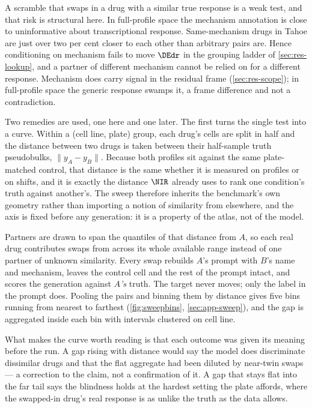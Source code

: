 A scramble that swaps in a drug with a similar true response is a weak test, and
that risk is structural here. In full-profile space the mechanism annotation is
close to uninformative about transcriptional response. Same-mechanism drugs in
Tahoe are just over two per cent closer to each other than arbitrary pairs
are.
Hence conditioning on mechanism fails to move $\DEdr$ in the grouping ladder of
\cref{sec:res-lookup}, and a partner of different mechanism cannot be relied on
for a different response. Mechanism does carry signal in the residual frame
(\cref{sec:res-scope}); in full-profile space the generic response swamps it, a
frame difference and not a contradiction.

Two remedies are used, one here and one later. The first turns the single test
into a curve. Within a (cell line, plate) group, each drug's cells are split in
half and the distance between two drugs is taken between their half-sample truth
pseudobulks, $\lVert y_A - y_B \rVert$. Because both profiles sit against the
same plate-matched control, that distance is the same whether it is measured on
profiles or on shifts, and it is exactly the distance $\NIR$ already uses to rank
one condition's truth against another's. The sweep therefore inherits the
benchmark's own geometry rather than importing a notion of similarity from
elsewhere, and the axis is fixed before any generation: it is a property of the
atlas, not of the model.

Partners are drawn to span the quantiles of that distance from $A$, so each real
drug contributes swaps from across its whole available range instead of one
partner of unknown similarity. Every swap rebuilds $A$'s prompt with $B$'s name
and mechanism, leaves the control cell and the rest of the prompt intact, and
scores the generation against \emph{$A$'s} truth. The target never moves; only
the label in the prompt does. Pooling the pairs and binning them by distance
gives five bins running from nearest to farthest
(\cref{fig:sweepbins}, \cref{sec:app-sweep}), and the gap is aggregated inside
each bin with intervals clustered on cell line.

What makes the curve worth reading is that each outcome was given its meaning
before the run. A gap rising with distance would say the model does discriminate
dissimilar drugs and that the flat aggregate had been diluted by near-twin swaps
--- a correction to the claim, not a confirmation of it. A gap that stays flat
into the far tail says the blindness holds at the hardest setting the plate
affords, where the swapped-in drug's real response is as unlike the truth as the
data allows.

